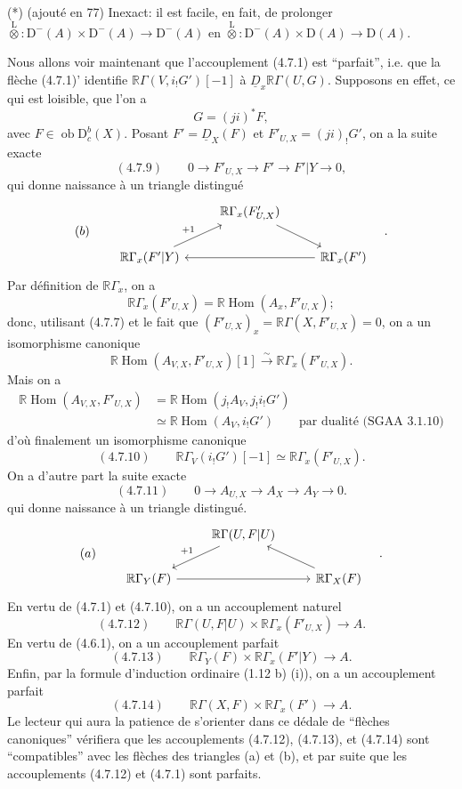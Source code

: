 \documentclass[11pt]{article}
\DeclareMathOperator{\Hom}{Hom}
\newcommand{\R}{\mathbb{R}}\newcommand{\RHomCore}{\mathbb{R}\mathrm{Hom}}
\newcommand{\D}{\mathrm{D}}
\newcommand{\ob}{\operatorname{ob}}
\providecommand{\Hom}{\operatorname{Hom}}
\providecommand{\ob}{\operatorname{ob}}
\providecommand{\R}{\mathrm R}
\providecommand{\Hom}{\operatorname{Hom}}
\begin{document}
(*) (ajouté en 77) Inexact: il est facile, en fait, de prolonger $\overset{\mathrm L}{\otimes}:\D^-(A)\times\D^-(A)\to\D^-(A)$ en $\overset{\mathrm L}{\otimes}:\D^-(A)\times\D(A)\to\D(A)$.

Nous allons voir maintenant que l'accouplement (4.7.1) est ``parfait'', i.e. que la flèche (4.7.1)' identifie $\R\Gamma(V,i_!G')[-1]$ à $\underline{D}_x\R\Gamma(U,G)$. Supposons en effet, ce qui est loisible, que l'on a
\[
G=(ji)^*F,
\]
avec $F\in\ob\D_c^b(X)$. Posant $F'=\underline{D}_X(F)$ et $F'_{U,X}=(ji)_!G'$, on a la suite exacte
\[
(4.7.9)\qquad 0\longrightarrow F'_{U,X}\longrightarrow F'\longrightarrow F'|Y\longrightarrow0,
\]
qui donne naissance à un triangle distingué
\[
(b)\qquad
\begin{tikzcd}
& \R\Gamma_x(F'_{U,X}) \arrow[dr] \\
\R\Gamma_x(F'|Y) \arrow[ur,"{+1}"] && \R\Gamma_x(F') \arrow[ll]
\end{tikzcd}\quad .
\]
Par définition de $\R\Gamma_x$, on a
\[
\R\Gamma_x(F'_{U,X})=\R\Hom(A_x,F'_{U,X});
\]
donc, utilisant (4.7.7) et le fait que $(F'_{U,X})_x=\R\Gamma(X,F'_{U,X})=0$, on a un isomorphisme canonique
\[
\R\Hom(A_{V,X},F'_{U,X})[1]\xrightarrow{\sim}\R\Gamma_x(F'_{U,X}).
\]
Mais on a
\[
\begin{aligned}
\R\Hom(A_{V,X},F'_{U,X})&=\R\Hom(j_!A_V,j_!i_!G')\\
&\simeq\R\Hom(A_V,i_!G')\qquad\text{par dualité (SGAA~3.1.10)}
\end{aligned}
\]
d'où finalement un
isomorphisme canonique
\[
(4.7.10)\qquad \R\Gamma_V(i_!G')[-1]\simeq\R\Gamma_x(F'_{U,X}).
\]
On a d'autre part la suite exacte
\[
(4.7.11)\qquad 0\longrightarrow A_{U,X}\longrightarrow A_X\longrightarrow A_Y\longrightarrow0.
\]
qui donne naissance à un triangle distingué.
\[
(a)\qquad
\begin{tikzcd}
& \R\Gamma(U,F|U) \arrow[dl,"{+1}"'] \\
\R\Gamma_Y(F) \arrow[rr] && \R\Gamma_X(F) \arrow[ul]
\end{tikzcd}\quad .
\]
En vertu de (4.7.1) et (4.7.10), on a un accouplement naturel
\[
(4.7.12)\qquad \R\Gamma(U,F|U)\times\R\Gamma_x(F'_{U,X})\longrightarrow A.
\]
En vertu de (4.6.1), on a un accouplement parfait
\[
(4.7.13)\qquad \R\Gamma_Y(F)\times\R\Gamma_x(F'|Y)\longrightarrow A.
\]
Enfin, par la formule d'induction ordinaire (1.12 b) (i)), on a un accouplement parfait
\[
(4.7.14)\qquad \R\Gamma(X,F)\times\R\Gamma_x(F')\longrightarrow A.
\]
Le lecteur qui aura la patience de s'orienter dans ce dédale de ``flèches canoniques'' vérifiera que les accouplements (4.7.12), (4.7.13), et (4.7.14) sont ``compatibles'' avec les flèches des triangles (a) et (b), et par suite que les accouplements (4.7.12) et (4.7.1) sont parfaits.
\end{document}
